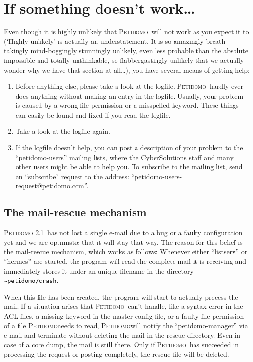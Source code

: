 \documentclass[a4paper]{report}
\newcommand{\Petidomo}{{\scshape Peti\-domo}}
\newcommand{\PetidomoTwo}{{\scshape Peti\-domo 2.1}}
\newcommand{\file}[1]{{\tt #1}}
\begin{document}
\chapter{If something doesn't work\dots{}}

Even though it is highly unlikely that \Petidomo\ will not
work as you expect it to (`Highly unlikely' is actually an
understatement. It is so amazingly breath-takingly mind-boggingly
stunningly unlikely, even less probable than the absolute impossible
and totally unthinkable, so flabbergastingly unlikely that we actually
wonder why we have that section at all\dots{}), you have several means
of getting help:

\begin{enumerate}

\item Before anything else, please take a look at the logfile.
\Petidomo\ hardly ever does anything without making an entry in the
logfile. Usually, your problem is caused by a wrong file permission or
a misspelled keyword. These things can easily be found and fixed if
you read the logfile.

\item Take a look at the logfile again.

\item If the logfile doesn't help, you can post a description of your
problem to the ``petidomo-users'' mailing lists, where the
CyberSolutions staff and many other users might be able to help you.
To subscribe to the mailing list, send an ``subscribe'' request to the
address: ``petidomo-users-request@petidomo.com''.

\end{enumerate}

\section{The mail-rescue mechanism}

\PetidomoTwo\ has not lost a single e-mail due to a bug or a faulty
configuration yet and we are optimistic that it will stay that way.
The reason for this belief is the mail-rescue mechanism, which works
as follows: Whenever either ``listserv'' or ``hermes'' are started,
the program will read the complete mail it is receiving and
immediately stores it under an unique filename in the directory
\file{\~{}petidomo/crash}.

When this file has been created, the program will start to actually
process the mail. If a situation arises that \Petidomo\ can't handle,
like a syntax error in the ACL files, a missing keyword in the master
config file, or a faulty file permission of a file \Petidomo needs to
read, \Petidomo will notify the ``petidomo-manager'' via e-mail and
terminate without deleting the mail in the rescue-directory. Even in
case of a core dump, the mail is still there. Only if \Petidomo\ has
succeeded in processing the request or posting completely, the rescue
file will be deleted.
\end{document}
